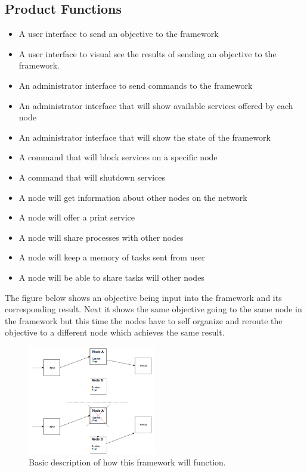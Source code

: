 \documentclass[draftclsnofoot, onecolumn, compsoc, 10pt]{IEEEtran}
\begin{document}
\subsection{Product Functions}
\begin{itemize}
\item A user interface to send an objective to the framework
\item A user interface to visual see the results of sending an objective to the framework.
\item An administrator interface to send commands to the framework
\item An administrator interface that will show available services offered by each node
\item An administrator interface that will show the state of the framework
\item A command that will block services on a specific node
\item A command that will shutdown services
\item A node will get information about other nodes on the network
\item A node will offer a print service
\item A node will share processes with other nodes
\item A node will keep a memory of tasks sent from user
\item A node will be able to share tasks will other nodes
\end{itemize}
The figure below shows an objective being input into the framework and its corresponding result. Next it shows the same objective going to the same node in the framework but this time the nodes have to self organize and reroute the objective to a different node which achieves the same result.
\begin{figure}[!htb]
  
  \centering
    \includegraphics[width=0.5\textwidth]{img_1}
  \caption{Basic description of how this framework will function. }
\end{figure}
\FloatBarrier
\end{document}
